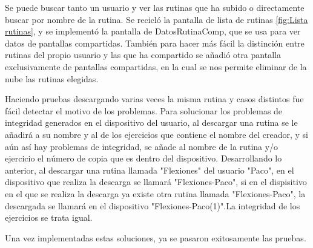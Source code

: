 Se puede buscar tanto un usuario y ver las rutinas que ha subido o directamente buscar por nombre de la rutina. Se recicló la pantalla de lista de rutinas \cref{fig:Lista rutinas}, y se implementó la pantalla de DatosRutinaComp, que se usa para ver datos de pantallas compartidas. También para hacer más fácil la distinción entre rutinas del propio usuario y las que ha compartido se añadió otra pantalla exclusivamente de pantallas compartidas, en la cual se nos permite eliminar de la nube las rutinas elegidas.

Haciendo pruebas descargando varias veces la misma rutina y casos distintos fue fácil detectar el motivo de los problemas. Para solucionar los problemas de integridad generados en el dispositivo del usuario, al descargar una rutina se le añadirá a su nombre y al de los ejercicios que contiene el nombre del creador, y si aún así hay problemas de integridad, se añade al nombre de la rutina y/o ejercicio el número de copia que es dentro del dispositivo. Desarrollando lo anterior, al descargar una rutina llamada "Flexiones" del usuario "Paco", en el dispositivo que realiza la descarga se llamará "Flexiones-Paco", si en el dispisitivo en el que se realiza la descarga ya existe otra rutina llamada "Flexiones-Paco", la descargada se llamará en el dispositivo "Flexiones-Paco(1)".La integridad de los ejercicios se trata igual.

Una vez implementadas estas soluciones, ya se pasaron exitosamente las pruebas.

